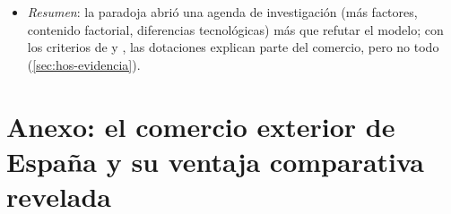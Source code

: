 \documentclass[11pt]{article}
\begin{document}
\begin{itemize}
\begin{itemize}
  \item \emph{la política comercial}: los aranceles de Estados Unidos protegían sobre todo los bienes intensivos en trabajo poco cualificado, lo que sesgaba las importaciones hacia los intensivos en capital\nocite{Travis1964Theory,Baldwin1971Determinants};
  \item \emph{tecnologías y gustos distintos}: con tecnologías distintas o un sesgo de la demanda de Estados Unidos hacia los bienes intensivos en capital, la predicción cambia (nota~\ref{fn:sesgo-demanda}).
  \end{itemize}
\item \emph{Resumen}: la paradoja abrió una agenda de investigación (más factores, contenido factorial, diferencias tecnológicas) más que refutar el modelo; con los criterios de  y , las dotaciones explican parte del comercio, pero no todo (\ref{sec:hos-evidencia}).
\end{itemize}

\section{Anexo: el comercio exterior de España\cortetitulo{} y su ventaja comparativa revelada}\label{anexo:datos}
\end{document}

